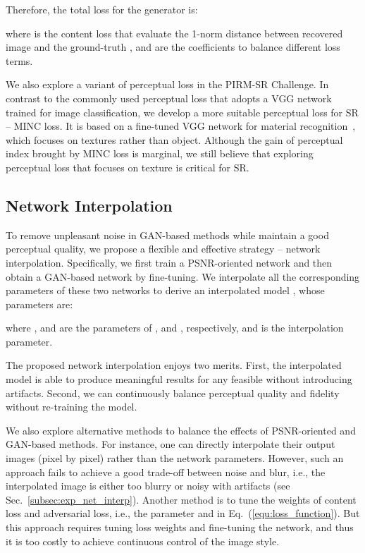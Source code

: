 \documentclass[runningheads]{llncs}
\begin{document}
Therefore, the total loss for the generator is:

where  is the content loss that evaluate the 1-norm distance between recovered 
image  and the ground-truth , and  are the coefficients to balance different loss terms.

We also explore a variant of perceptual loss in the PIRM-SR Challenge. 
In contrast to the commonly used perceptual loss that adopts a VGG network trained for image classification, we develop 
a more suitable perceptual loss for SR -- MINC loss.
It is based on a fine-tuned VGG network for material recognition~\cite{bell2015material}, which focuses on textures 
rather than object.
Although the gain of perceptual index brought by MINC loss is marginal, we still believe that exploring perceptual loss 
that focuses on texture is critical for SR.








\subsection{Network Interpolation}
\label{subsec:net_interp}

To remove unpleasant noise in GAN-based methods while maintain a good perceptual quality, we propose a flexible  
and effective strategy -- network interpolation. Specifically, we first train a PSNR-oriented network  
and then obtain a GAN-based network  by fine-tuning. We interpolate all the corresponding parameters of 
these two networks to derive an interpolated model , whose parameters are:

where ,  and  are the parameters of  
,  and , respectively, and  is the interpolation 
parameter.

The proposed network interpolation enjoys two merits. First, the interpolated model is able to produce meaningful  
results for any feasible  without introducing artifacts. Second, we can continuously balance perceptual quality 
and fidelity without re-training the model.

We also explore alternative methods to balance the effects of PSNR-oriented and GAN-based methods.
For instance, one can directly interpolate their output images (pixel by pixel) rather than the network parameters.
However, such an approach fails to achieve a good trade-off between noise and blur, i.e., the interpolated image is 
either too blurry or noisy with artifacts (see Sec.~\ref{subsec:exp_net_interp}). 
Another method is to tune the weights of content loss and adversarial loss, i.e., the parameter  and  in 
Eq.~(\ref{equ:loss_function}).
But this approach requires tuning loss weights and fine-tuning the network, and thus it is too costly to achieve 
continuous control of the image style.
\end{document}
